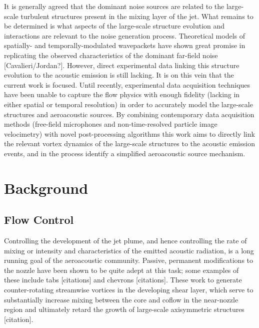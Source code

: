 It is generally agreed that the dominant noise sources are related to the large-scale turbulent structures present in the mixing layer of the jet. 
What remains to be determined is what aspects of the large-scale structure evolution and interactions are relevant to the noise generation process. 
Theoretical models of spatially- and temporally-modulated wavepackets have shown great promise in replicating the observed characteristics of the dominant far-field noise [Cavalieri/Jordan?]. 
However, direct experimental data linking this structure evolution to the acoustic emission is still lacking. 
It is on this vein that the current work is focused.
Until recently, experimental data acquisition techniques have been unable to capture the flow physics with enough fidelity (lacking in either spatial or temporal resolution) in order to accurately model the large-scale structures and aeroacoustic sources.
By combining contemporary data acquisition methods (free-field microphones and non-time-resolved particle image velocimetry) with novel post-processing algorithms this work aims to directly link the relevant vortex dynamics of the large-scale structures to the acoustic emission events, and in the process identify a simplified aeroacoustic source mechanism. 
	
\section{Background}
\subsection{Flow Control}
Controlling the development of the jet plume, and hence controlling the rate of mixing or intensity and characteristics of the emitted acoustic radiation, is a long running goal of the aeroacoustic community.
Passive, permanent modifications to the nozzle have been shown to be quite adept at this task; some examples of these include tabs [citations] and chevrons [citations]. 
These work to generate counter-rotating streamwise vortices in the developing shear layer, which serve to substantially increase mixing between the core and coflow in the near-nozzle region and ultimately retard the growth of large-scale axisymmetric structures [citation].

